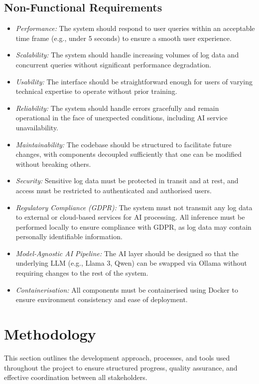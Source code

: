 \documentclass[12pt, a4paper]{article}
\begin{document}
\subsection{Non-Functional Requirements} %
\begin{itemize}
    \item \textit{Performance:} The system should respond to user queries within an acceptable time frame (e.g., under 5 seconds) to ensure a smooth user experience.
    \item \textit{Scalability:} The system should handle increasing volumes of log data and concurrent queries without significant performance degradation.
    \item \textit{Usability:} The interface should be straightforward enough for users of varying technical expertise to operate without prior training.
    \item \textit{Reliability:} The system should handle errors gracefully and remain operational in the face of unexpected conditions, including AI service unavailability.
    \item \textit{Maintainability:} The codebase should be structured to facilitate future changes, with components decoupled sufficiently that one can be modified without breaking others.
    \item \textit{Security:} Sensitive log data must be protected in transit and at rest, and access must be restricted to authenticated and authorised users.
    \item \textit{Regulatory Compliance (GDPR):} The system must not transmit any log data to external or cloud-based services for AI processing. All inference must be performed locally to ensure compliance with GDPR, as log data may contain personally identifiable information.
    \item \textit{Model-Agnostic AI Pipeline:} The AI layer should be designed so that the underlying LLM (e.g., Llama 3, Qwen) can be swapped via Ollama without requiring changes to the rest of the system.
    \item \textit{Containerisation:} All components must be containerised using Docker to ensure environment consistency and ease of deployment.
\end{itemize}

\section{Methodology}
This section outlines the development approach, processes, and tools used throughout the project to ensure structured progress, quality assurance, and effective coordination between all stakeholders.
\end{document}

